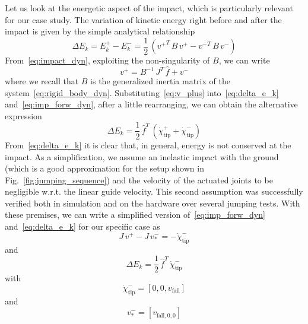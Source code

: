 Let us look at the energetic aspect of the impact, which is particularly relevant for our case study. The variation of kinetic energy right before and after the impact is given by the simple analytical relationship
\begin{dmath}\label{eq:delta_e_k}
    \Delta E_k = E_k^{+} - E_k^{-} = \dfrac{1}{2}\,\left({v^{+}}^T\,B\,v^{+} - {v^{-}}^T\,B\,v^{-}\right)
\end{dmath}
From~\eqref{eq:impact_dyn}, exploiting the non-singularity of $B$, we can write
\begin{equation}\label{eq:v_plus}
v^+ = B^{-1}\,J^T\,\hat{f} + v^{-}
\end{equation}
where we recall that $B$ is the generalized inertia matrix of the system~\eqref{eq:rigid_body_dyn}.
Substituting~\eqref{eq:v_plus} into~\eqref{eq:delta_e_k} and~\eqref{eq:imp_forw_dyn}, after a little rearranging, we can obtain the alternative expression
\begin{dmath}\label{eq:delta_e_k_altern}
    \Delta E_k = \dfrac{1}{2}\,\hat{f}^T\,\left(\dot{\chi}_{\mathrm{tip}}^{+} + \dot{\chi}_{\mathrm{tip}}^{-}\right)
\end{dmath}
From~\eqref{eq:delta_e_k} it is clear that, in general, energy is not conserved at the impact. As a simplification, we assume an inelastic impact with the ground (which is a good approximation for the setup shown in Fig.~\ref{fig:jumping_sequence}) and the velocity of the actuated joints to be negligible w.r.t. the linear guide velocity. This second assumption was successfully verified both in simulation and on the hardware over several jumping tests. With these premises, we can write a simplified version of~\eqref{eq:imp_forw_dyn} and~\eqref{eq:delta_e_k} for our specific case as
\begin{dmath}\label{eq:imp_forw_dyn_simpl}
    J\, v^{+} - J\, v^{-}_{*} = - \dot{\chi}_{\mathrm{tip}}^{-}
\end{dmath}
and 
\begin{dmath}\label{eq:delta_e_k_simpl}
    \Delta E_k = \dfrac{1}{2}\,\hat{f}^T\, \dot{\chi}_{\mathrm{tip}}^{-}
\end{dmath}
with 
\begin{equation} \label{eq:chi_dot_simpl}
    \dot{\chi}_{\mathrm{tip}}^{-} = \left[0, 0, 
v_{\mathrm{fall}}\right]
\end{equation}
and 
\begin{equation} \label{eq:v_m_star}
    v^{-}_{*} = \left[v_{\mathrm{fall}, 0, 0}\right]
\end{equation}
